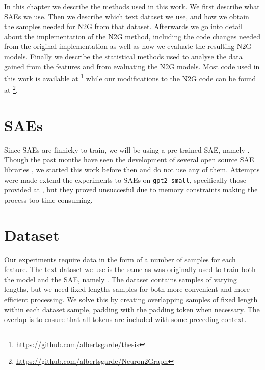 In this chapter we describe the methods used in this work.
We first describe what SAEs we use.
Then we describe which text dataset we use, and how we obtain the samples needed for N2G from that dataset.
Afterwards we go into detail about the implementation of the N2G method, including the code changes needed from the original implementation as well as how we evaluate the resulting N2G models.
Finally we describe the statistical methods used to analyse the data gained from the features and from evaluating the N2G models.
Most code used in this work is available at \footnote{\url{https://github.com/albertsgarde/thesis}} while our modifications to the N2G code can be found at \footnote{\url{https://github.com/albertsgarde/Neuron2Graph}}.

\section{SAEs}
Since SAEs are finnicky to train, we will be using a pre-trained SAE, namely \textcite{nanda_neelnandasparse_autoencoder_nodate}.
Though the past months have seen the development of several open source SAE libraries \parencite{bloom_jbloomaussaelens_2024}\parencite{cooney_ai-safety-foundationsparse_autoencoder_2024}, we started this work before then and do not use any of them.
Attempts were made extend the experiments to SAEs on \texttt{gpt2-small}, specifically those provided at \textcite{wu_openaisparse_autoencoder_2024}, but they proved unsuccesful due to memory constraints making the process too time consuming.

\section{Dataset}
\label{sec:dataset}
Our experiments require data in the form of a number of samples for each feature.
The text dataset we use is the same as was originally used to train both the model and the SAE, namely \textcite{nanda_neelnandac4-code-20k_nodate}.
The dataset contains samples of varying lengths, but we need fixed lengths samples for both more convenient and more efficient processing.
We solve this by creating overlapping samples of fixed length within each dataset sample, padding with the padding token when necessary.
The overlap is to ensure that all tokens are included with some preceding context.

